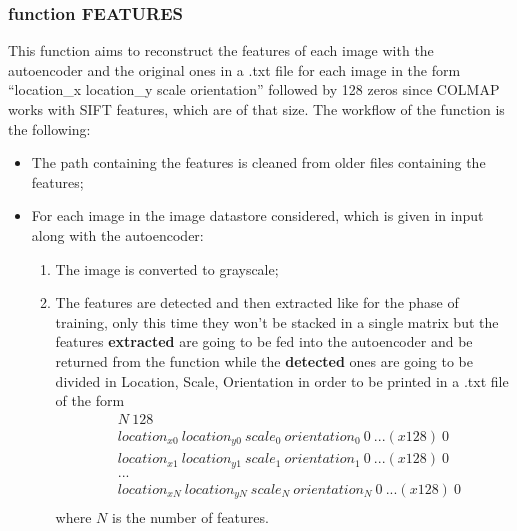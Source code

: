 \subsubsection{function FEATURES} \label{sec:FEATURES}
This function aims to reconstruct the features of each image with the autoencoder and the original ones in a .txt file for each image in the form ``location\_x location\_y scale orientation'' followed by 128 zeros since COLMAP works with SIFT features, which are of that size.
The workflow of the function is the following:
\begin{itemize}
\item The path containing the features is cleaned from older files containing the features;
\item For each image in the image datastore considered, which is given in input along with the autoencoder:
\begin{enumerate}
\item The image is converted to grayscale;
\item The features are detected and then extracted like for the phase of training, only this time they won't be stacked in a single matrix but the features \textbf{extracted} are going to be fed into the autoencoder and be returned from the function while the \textbf{detected} ones are going to be divided in Location, Scale, Orientation in order to be printed in a .txt file of the form
\begin{align*}
& N\ 128 \\
& location_{x0} \ location_{y0} \ scale_0 \ orientation_0 \ 0\  ... (x128)\  0 \\
& location_{x1} \ location_{y1} \ scale_1 \ orientation_1 \ 0\  ... (x128)\  0 \\
& ... \\
& location_{xN} \ location_{yN} \ scale_N \ orientation_N \ 0\  ... (x128)\  0 \\
\end{align*}  
where $N$ is the number of features.
\end{enumerate} 
\end{itemize}

